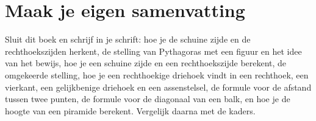 \begin{oefeningen}


























\end{oefeningen}


\begin{oefeningen}






\end{oefeningen}


\ifzelfstudie
\section*{Maak je eigen samenvatting}
Sluit dit boek en schrijf in je schrift: hoe je de schuine zijde en de rechthoekszijden herkent, de stelling van Pythagoras met een figuur en het idee van het bewijs, hoe je een schuine zijde en een rechthoekszijde berekent, de omgekeerde stelling, hoe je een rechthoekige driehoek vindt in een rechthoek, een vierkant, een gelijkbenige driehoek en een assenstelsel, de formule voor de afstand tussen twee punten, de formule voor de diagonaal van een balk, en hoe je de hoogte van een piramide berekent. Vergelijk daarna met de kaders.
\fi

